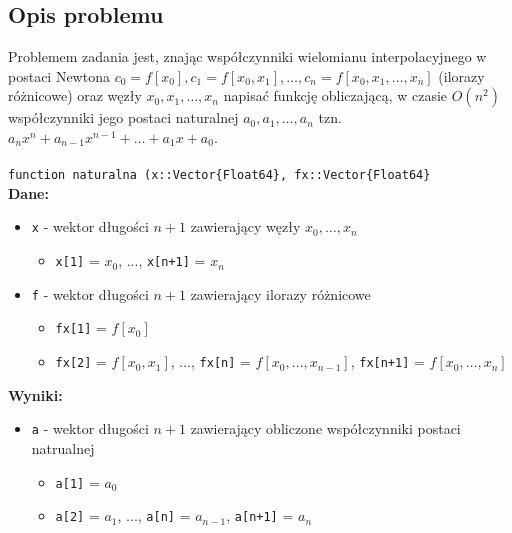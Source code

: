 \documentclass{article}
\begin{document}
\subsection{Opis problemu}
Problemem zadania jest, znając współczynniki wielomianu interpolacyjnego w postaci Newtona $c_0 = f[x_0], c_1 = f[x_0, x_1], \dots, c_n = f[x_0, x_1, \dots, x_n]$ (ilorazy różnicowe) oraz węzły $x_0, x_1, \dots, x_n$ napisać funkcję obliczającą, w czasie $O(n^2)$ współczynniki jego postaci naturalnej $a_0, a_1, \dots, a_n$ tzn. $a_nx^n + a_{n-1}x^{n-1} + \dots + a_1x + a_0$.
\\ \\ \texttt{function naturalna (x::Vector\{Float64\}, fx::Vector\{Float64\}}
\\ \textbf{Dane:}
\begin{itemize}[label={}]
    \item \texttt{x} - wektor długości $n+1$ zawierający węzły $x_0, \dots, x_n$ 
        \begin{itemize}[label={}]
            \item \texttt{x[1]} = $x_0$, ..., \texttt{x[n+1]} = $x_n$
        \end{itemize}
    \item \texttt{f} - wektor długości $n+1$ zawierający ilorazy różnicowe
        \begin{itemize}[label={}]
            \item \texttt{fx[1]} = $f[x_0]$
            \item \texttt{fx[2]} = $f[x_0, x_1]$, ..., \texttt{fx[n]} = $f[x_0, \dots, x_{n-1}]$, \texttt{fx[n+1]} = $f[x_0, \dots, x_n]$
        \end{itemize}
\end{itemize}
\textbf{Wyniki:}
\begin{itemize}[label={}]
    \item \texttt{a} - wektor długości $n+1$ zawierający obliczone współczynniki postaci natrualnej
    \begin{itemize}[label={}]
        \item \texttt{a[1]} = $a_0$
        \item \texttt{a[2]} = $a_1$, ..., \texttt{a[n]} = $a_{n-1}$, \texttt{a[n+1]} = $a_n$
    \end{itemize}
\end{itemize}
\end{document}
